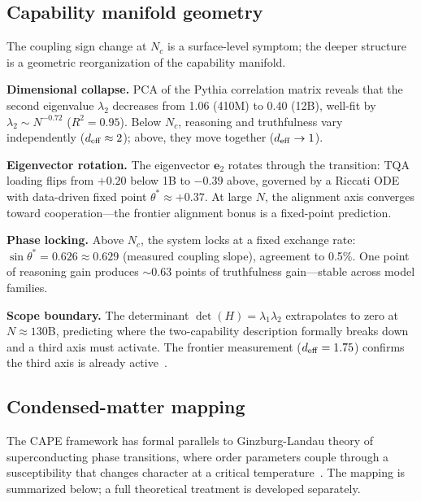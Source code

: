 \documentclass{article}
\begin{document}
\subsection{Capability manifold geometry}
\label{app:topology}

The coupling sign change at $N_c$ is a surface-level symptom;
the deeper structure is a geometric reorganization of the capability manifold.

\textbf{Dimensional collapse.}
PCA of the Pythia correlation matrix reveals that the second eigenvalue
$\lambda_2$ decreases from 1.06 (410M) to 0.40 (12B),
well-fit by $\lambda_2 \sim N^{-0.72}$ ($R^2 = 0.95$).
Below $N_c$, reasoning and truthfulness vary independently ($d_{\rm eff} \approx 2$);
above, they move together ($d_{\rm eff} \to 1$).

\textbf{Eigenvector rotation.}
The eigenvector $\mathbf{e}_2$ rotates through the transition:
TQA loading flips from $+0.20$ below 1B to $-0.39$ above,
governed by a Riccati ODE with data-driven fixed point $\theta^* \approx +0.37$.
At large $N$, the alignment axis converges toward cooperation---the
frontier alignment bonus is a fixed-point prediction.

\textbf{Phase locking.}
Above $N_c$, the system locks at a fixed exchange rate:
$\sin\theta^* = 0.626 \approx 0.629$ (measured coupling slope),
agreement to 0.5\%.
One point of reasoning gain produces $\sim$0.63 points of truthfulness gain---stable
across model families.

\textbf{Scope boundary.}
The determinant $\det(H) = \lambda_1 \lambda_2$ extrapolates to zero at $N \approx 130$B,
predicting where the two-capability description formally breaks down
and a third axis must activate.
The frontier measurement ($d_{\rm eff} = 1.75$) confirms the third axis
is already active~\cite{amin2026growing}.

\subsection{Condensed-matter mapping}
\label{app:cm_mapping}

The CAPE framework has formal parallels to Ginzburg-Landau theory
of superconducting phase transitions,
where order parameters couple through a susceptibility
that changes character at a critical temperature~\cite{amin2020}.
The mapping is summarized below; a full theoretical treatment
is developed separately.
\end{document}
